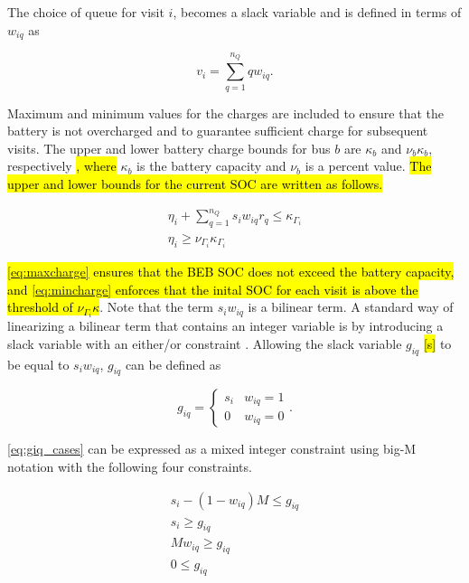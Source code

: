 \documentclass[utf8]{FrontiersinHarvard}
\let\cite\citep                                       %
\begin{document}
The choice of queue for visit \(i\), becomes a slack variable and is defined in terms of \(w_{iq}\) as

\begin{equation}
    v_i = \sum_{q=1}^{n_Q} qw_{iq}.
\end{equation}

Maximum and minimum values for the charges are included to ensure that the battery is not overcharged and to guarantee
sufficient charge for subsequent visits. The upper and lower battery charge bounds for bus \(b\) are \(\kappa_b\) and \(\nu_b \kappa_b\),
respectively \hl{, where} \(\kappa_b\) is the battery capacity and \(\nu_b\) is a percent value. \hl{The upper and lower bounds for the current SOC are written as follows.}

\begin{subequations}
    \label{subeq:pre_min_max}
\begin{align}
    \eta_i + \sum_{q=1}^{n_Q} s_i w_{iq} r_q \leq \kappa_{\Gamma_i} \label{eq:maxcharge}\\
    \eta_i \geq \nu_{\Gamma_i} \kappa_{\Gamma_i} \label{eq:mincharge}
\end{align}
\end{subequations}

\hl{{\autoref{eq:maxcharge}} ensures that the BEB SOC does not exceed the battery capacity, and {\autoref{eq:mincharge}} enforces that the inital SOC for each visit is above the threshold of $\nu_{\Gamma_i}\kappa$}. Note that
the term \(s_i w_{iq}\) is a bilinear term. A standard way of linearizing a bilinear term that contains an integer
variable is by introducing a slack variable with an either/or constraint
\cite{chen-2010-applied,rodriguez-2013-compar-asses}. Allowing the slack variable \(g_{iq}\) \hl{[s]} to be
equal to \(s_i w_{iq}\), \(g_{iq}\) can be defined as

\begin{equation}
    \label{eq:giq_cases}
    g_{iq} =
    \begin{cases}
        s_i & w_{iq} = 1 \\
        0 & w_{iq} = 0
    \end{cases}.
\end{equation}

\autoref{eq:giq_cases} can be expressed as a mixed integer constraint using big-M notation with the following four
constraints.

\begin{subequations}
    \label{eq:slack_gain}
\begin{align}
    s_i - (1 - w_{iq})M \leq g_{iq}  \label{subeq:repgpgret} \\
    s_i \geq g_{iq}                 \label{subeq:repgples} \\
    Mw_{iq} \geq g_{iq}              \label{subeq:repgwgret} \\
    0 \leq g_{iq}                   \label{subeq:repgwles}
\end{align}
\end{subequations}
\end{document}
